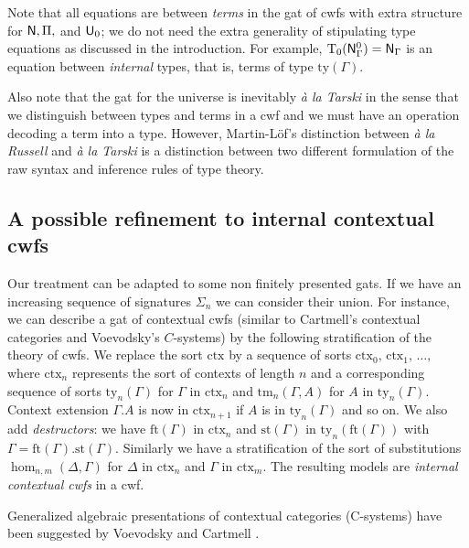 \documentclass{lmcs}
\newcommand{\Ta}{\mathrm{T}}
\newcommand{\ctx}{\mathrm{ctx}}
\newcommand{\ty}{\mathrm{ty}}
\newcommand{\tm}{\mathrm{tm}}
\begin{document}
\begin{remark}\label{remark:typeequations}
Note that all equations are between {\em terms} in the gat of cwfs with extra structure for $\mathsf{N}, \Pi,$ and $\mathsf{U}_0$; we do not need the extra generality of stipulating type equations as discussed in the introduction. For example, $\Ta_0(\N^0_\Gamma) = \N_\Gamma$ is an equation between {\em internal} types, that is, terms of type $\ty(\Gamma)$.
\end{remark}

\begin{remark}
Also note that the gat for the universe is inevitably {\em \`a la Tarski} in the sense that we distinguish between types and terms in a cwf and we must have an operation decoding a term into a type. However, Martin-Löf's distinction between {\em \`a la Russell} and {\em \`a la Tarski} \cite{martinlof:padova} is a distinction between two different formulation of the raw syntax and inference rules of type theory.
\end{remark}

\subsection{A possible refinement to internal contextual cwfs}

Our treatment can be adapted to some non finitely presented gats.
If we have an increasing sequence of signatures $\Sigma_n$ we can consider their
union.
For instance, we can describe a gat of contextual cwfs \cite{castellan:lambek} (similar to Cartmell's contextual categories and Voevodsky's $C$-systems) by
the following stratification of the theory of cwfs. We replace the sort $\ctx$
by a sequence of sorts $\ctx_0,\,\ctx_1,\,\dots ,$ where $\ctx_n$ represents the sort
of contexts of length $n$ and a corresponding sequence of sorts
$\ty_n(\Gamma)$ for $\Gamma$ in $\ctx_n$
and $\tm_n(\Gamma,A)$ for $A$ in $\ty_n(\Gamma)$. Context extension $\Gamma.A$ is now in $\ctx_{n+1}$
if $A$ is in $\ty_n(\Gamma)$ and so on.
We also add {\em destructors}: we have
$\mathrm{ft}(\Gamma)$ in $\ctx_n$
and $\mathrm{st}(\Gamma)$ in $\ty_n(\mathrm{ft}(\Gamma))$
with $\Gamma = \mathrm{ft}(\Gamma).\mathrm{st}(\Gamma)$.
Similarly we have a stratification of the sort of substitutions
$\hom_{n,m}(\Delta,\Gamma)$ for $\Delta$ in $\ctx_n$ and $\Gamma$ in $\ctx_m$.
The resulting models are {\em internal contextual cwfs} in a cwf.

\begin{remark}
Generalized algebraic presentations of contextual categories (C-systems) have been suggested by Voevodsky \cite{voevodsky:c-systems} and Cartmell \cite{cartmell:gat-contextual}.
\end{remark}
\end{document}
